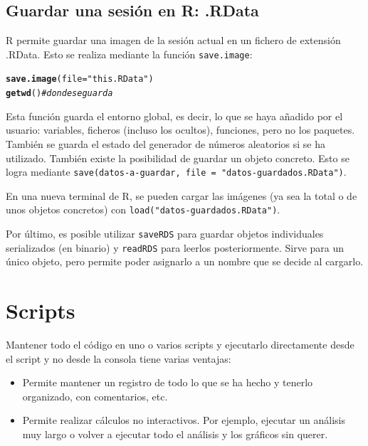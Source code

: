 \documentclass{config/apuntes}\usepackage[]{graphicx}\usepackage[]{xcolor}
\makeatletter
\newcommand{\hlsng}[1]{\textcolor[rgb]{0.192,0.494,0.8}{#1}}%
\newcommand{\hlcom}[1]{\textcolor[rgb]{0.678,0.584,0.686}{\textit{#1}}}%
\newcommand{\hldef}[1]{\textcolor[rgb]{0.345,0.345,0.345}{#1}}%
\newcommand{\hlkwc}[1]{\textcolor[rgb]{0.333,0.667,0.333}{#1}}%
\newcommand{\hlkwd}[1]{\textcolor[rgb]{0.737,0.353,0.396}{\textbf{#1}}}%
\newenvironment{kframe}{%
 \def\at@end@of@kframe{}%
 \ifinner\ifhmode%
  \def\at@end@of@kframe{\end{minipage}}%
  \begin{minipage}{\columnwidth}%
 \fi\fi%
 \def\FrameCommand##1{\hskip\@totalleftmargin \hskip-\fboxsep
 \colorbox{shadecolor}{##1}\hskip-\fboxsep
     \hskip-\linewidth \hskip-\@totalleftmargin \hskip\columnwidth}%
 \MakeFramed {\advance\hsize-\width
   \@totalleftmargin\z@ \linewidth\hsize
   \@setminipage}}%
 {\par\unskip\endMakeFramed%
 \at@end@of@kframe}
\newenvironment{knitrout}{}{} %
\newcommand{\code}[1]{\texttt{#1}}
\makeatother
\begin{document}
\subsection{Guardar una sesión en R: .RData}
R permite guardar una imagen de la sesión actual en un fichero de extensión .RData. Esto se realiza mediante la función \code{save.image}:

\begin{knitrout}
\color{fgcolor}\begin{kframe}
\begin{alltt}
\hlkwd{save.image}\hldef{(}\hlkwc{file} \hldef{=} \hlsng{"this.RData"}\hldef{)}
\hlkwd{getwd}\hldef{()} \hlcom{#donde se guarda}
\end{alltt}
\end{kframe}
\end{knitrout}

Esta función guarda el entorno global, es decir, lo que se haya añadido por el usuario: variables, ficheros (incluso los ocultos), funciones, pero no los paquetes. También se guarda el estado del generador de números aleatorios si se ha utilizado. También existe la posibilidad de guardar un objeto concreto. Esto se logra mediante \code{save(datos-a-guardar, file = "datos-guardados.RData")}.

En una nueva terminal de R, se pueden cargar las imágenes (ya sea la total o de unos objetos concretos) con \code{load("datos-guardados.RData")}.

Por último, es posible utilizar \code{saveRDS} para guardar objetos individuales serializados (en binario) y \code{readRDS} para leerlos posteriormente. Sirve para un único objeto, pero permite poder asignarlo a un nombre que se decide al cargarlo.

\section{Scripts}
Mantener todo el código en uno o varios scripts y ejecutarlo directamente desde el script y no desde la consola tiene varias ventajas:
\begin{itemize}
\item Permite mantener un registro de todo lo que se ha hecho y tenerlo organizado, con comentarios, etc.
\item Permite realizar cálculos no interactivos. Por ejemplo, ejecutar un análisis muy largo o volver a ejecutar todo el análisis y los gráficos sin querer.
\end{itemize}
\end{document}
